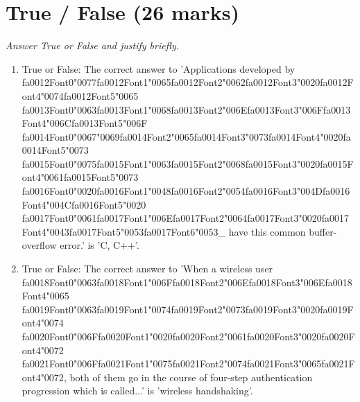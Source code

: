 \documentclass[12pt]{article}
\begin{document}
\section*{True / False (26 marks)}
\textit{Answer True or False and justify briefly.}
\begin{enumerate}[label=\arabic*.]
\item True or False: The correct answer to 'Applications developed by {\csname fa0012Font0\endcsname\char"0077}{\csname fa0012Font1\endcsname\char"0065}{\csname fa0012Font2\endcsname\char"0062}{\csname fa0012Font3\endcsname\char"0020}{\csname fa0012Font4\endcsname\char"0074}{\csname fa0012Font5\endcsname\char"0065} {\csname fa0013Font0\endcsname\char"0063}{\csname fa0013Font1\endcsname\char"0068}{\csname fa0013Font2\endcsname\char"006E}{\csname fa0013Font3\endcsname\char"006F}{\csname fa0013Font4\endcsname\char"006C}{\csname fa0013Font5\endcsname\char"006F} {\csname fa0014Font0\endcsname\char"0067}{\char"0069}{\csname fa0014Font2\endcsname\char"0065}{\csname fa0014Font3\endcsname\char"0073}{\csname fa0014Font4\endcsname\char"0020}{\csname fa0014Font5\endcsname\char"0073} {\csname fa0015Font0\endcsname\char"0075}{\csname fa0015Font1\endcsname\char"0063}{\csname fa0015Font2\endcsname\char"0068}{\csname fa0015Font3\endcsname\char"0020}{\csname fa0015Font4\endcsname\char"0061}{\csname fa0015Font5\endcsname\char"0073} {\csname fa0016Font0\endcsname\char"0020}{\csname fa0016Font1\endcsname\char"0048}{\csname fa0016Font2\endcsname\char"0054}{\csname fa0016Font3\endcsname\char"004D}{\csname fa0016Font4\endcsname\char"004C}{\csname fa0016Font5\endcsname\char"0020} {\csname fa0017Font0\endcsname\char"0061}{\csname fa0017Font1\endcsname\char"006E}{\csname fa0017Font2\endcsname\char"0064}{\csname fa0017Font3\endcsname\char"0020}{\csname fa0017Font4\endcsname\char"0043}{\csname fa0017Font5\endcsname\char"0053}{\csname fa0017Font6\endcsname\char"0053}\_ have this common buffer-overflow error.' is 'C, C++'.
\item True or False: The correct answer to 'When a wireless user {\csname fa0018Font0\endcsname\char"0063}{\csname fa0018Font1\endcsname\char"006F}{\csname fa0018Font2\endcsname\char"006E}{\csname fa0018Font3\endcsname\char"006E}{\csname fa0018Font4\endcsname\char"0065} {\csname fa0019Font0\endcsname\char"0063}{\csname fa0019Font1\endcsname\char"0074}{\csname fa0019Font2\endcsname\char"0073}{\csname fa0019Font3\endcsname\char"0020}{\csname fa0019Font4\endcsname\char"0074} {\csname fa0020Font0\endcsname\char"006F}{\csname fa0020Font1\endcsname\char"0020}{\csname fa0020Font2\endcsname\char"0061}{\csname fa0020Font3\endcsname\char"0020}{\csname fa0020Font4\endcsname\char"0072} {\csname fa0021Font0\endcsname\char"006F}{\csname fa0021Font1\endcsname\char"0075}{\csname fa0021Font2\endcsname\char"0074}{\csname fa0021Font3\endcsname\char"0065}{\csname fa0021Font4\endcsname\char"0072}, both of them go in the course of four-step authentication progression which is called...' is 'wireless handshaking'.

\end{enumerate}
\end{document}
